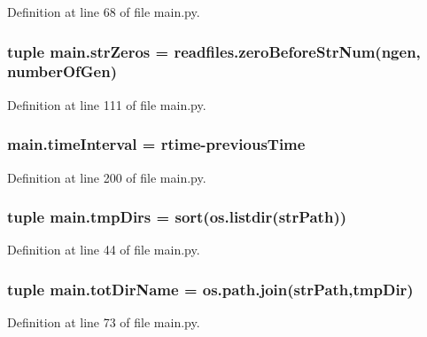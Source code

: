 Definition at line 68 of file main.\-py.

\hypertarget{a00111_a02d59015bebcf0ad1bc1162efca757c3}{
\subsubsection[{str\-Zeros}]{\setlength{\rightskip}{0pt plus 5cm}tuple main.\-str\-Zeros = readfiles.\-zero\-Before\-Str\-Num(ngen, {\bf number\-Of\-Gen})}}\label{a00111_a02d59015bebcf0ad1bc1162efca757c3}


Definition at line 111 of file main.\-py.

\hypertarget{a00111_a5ba0cd0b7538ed8047b2fea322ecb4b7}{
\subsubsection[{time\-Interval}]{\setlength{\rightskip}{0pt plus 5cm}main.\-time\-Interval = {\bf rtime}-\/{\bf previous\-Time}}}\label{a00111_a5ba0cd0b7538ed8047b2fea322ecb4b7}


Definition at line 200 of file main.\-py.

\hypertarget{a00111_a9606754176252315321d1faa6191479e}{
\subsubsection[{tmp\-Dirs}]{\setlength{\rightskip}{0pt plus 5cm}tuple main.\-tmp\-Dirs = sort(os.\-listdir({\bf str\-Path}))}}\label{a00111_a9606754176252315321d1faa6191479e}


Definition at line 44 of file main.\-py.

\hypertarget{a00111_a82f73a786e4c93e909fd689ee0d0812e}{
\subsubsection[{tot\-Dir\-Name}]{\setlength{\rightskip}{0pt plus 5cm}tuple main.\-tot\-Dir\-Name = os.\-path.\-join({\bf str\-Path},tmp\-Dir)}}\label{a00111_a82f73a786e4c93e909fd689ee0d0812e}


Definition at line 73 of file main.\-py.

